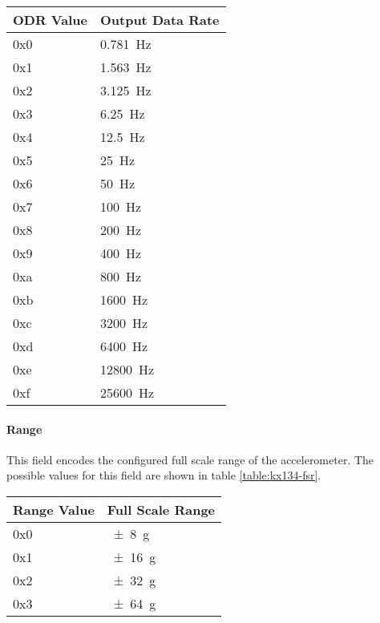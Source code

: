 \begin{table*}[htb]
\centering
\begin{tabular}{@{}ll@{}}
\toprule
ODR Value  &   Output Data Rate \\
\midrule
0x0        &   {\SI{0.781}{\hertz}} \\
0x1        &   {\SI{1.563}{\hertz}} \\
0x2        &   {\SI{3.125}{\hertz}} \\
0x3        &   {\SI{6.25}{\hertz}} \\
0x4        &   {\SI{12.5}{\hertz}} \\
0x5        &   {\SI{25}{\hertz}} \\
0x6        &   {\SI{50}{\hertz}} \\
0x7        &   {\SI{100}{\hertz}} \\
0x8        &   {\SI{200}{\hertz}} \\
0x9        &   {\SI{400}{\hertz}} \\
0xa        &   {\SI{800}{\hertz}} \\
0xb        &   {\SI{1600}{\hertz}} \\
0xc        &   {\SI{3200}{\hertz}} \\
0xd        &   {\SI{6400}{\hertz}} \\
0xe        &   {\SI{12800}{\hertz}} \\
0xf        &   {\SI{25600}{\hertz}} \\
\bottomrule
\end{tabular}
\caption{KX134-1211 Output Data Rate Values}
\label{table:kx134-odr}
\end{table*}

\paragraph{Range}
This field encodes the configured full scale range of the accelerometer. The
possible values for this field are shown in table \ref{table:kx134-fsr}.

\begin{table*}[htb]
\centering
\begin{tabular}{@{}ll@{}}
\toprule
Range Value &   Full Scale Range \\
\midrule
0x0         &   {\SI{\pm 8}{g}} \\
0x1         &   {\SI{\pm 16}{g}} \\
0x2         &   {\SI{\pm 32}{g}} \\
0x3         &   {\SI{\pm 64}{g}} \\
\bottomrule
\end{tabular}
\caption{KX134-1211 Full Scale Range Values}
\label{table:kx134-fsr}
\end{table*}

